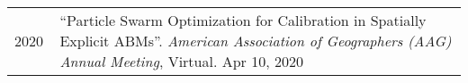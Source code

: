 \documentclass{acmcv}
\begin{document}
\begin{longtable}{p{0.1\linewidth} p{0.9\linewidth}}
        2020 & ``Particle Swarm Optimization for Calibration in Spatially Explicit ABMs''. \textit{American Association of Geographers (AAG) Annual Meeting}, Virtual. Apr 10, 2020 \\




    \end{longtable}
    \vspace*{-0.2cm}
    
\end{document}
